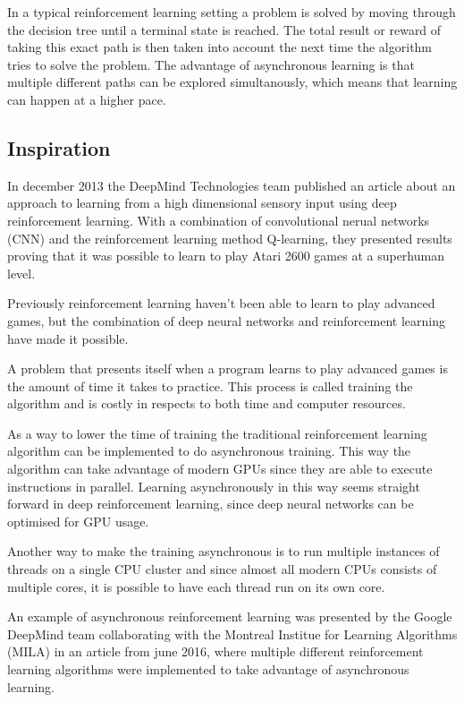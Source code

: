 \documentclass[11pt]{article}
\begin{document}
In a typical reinforcement learning setting a problem is solved
by moving through the decision tree until a terminal state is reached.
The total result or reward of taking this exact path is then
taken into account the next time the algorithm tries to solve the problem.
The advantage of asynchronous learning is that multiple different paths
can be explored simultanously, which means that learning can happen at
a higher pace.

\subsection{Inspiration}

In december 2013 the DeepMind Technologies team published an article
about an approach to learning from a high dimensional sensory input
using deep reinforcement learning\cite{dqn}.
With a combination of convolutional nerual networks (CNN) and
the reinforcement learning method Q-learning\cite{RLbook}, they
presented results proving that it was possible to learn to play Atari
2600 games at a superhuman level.

Previously reinforcement learning haven't been able to learn to play
advanced games, but the combination of deep neural networks and
reinforcement learning have made it possible.

A problem that presents itself when a program learns to play advanced 
games is the amount of time it takes to practice.
This process is called training the algorithm and is costly in respects
to both time and computer resources.

As a way to lower the time of training the traditional reinforcement
learning algorithm can be implemented to do asynchronous training.
This way the algorithm can take advantage of modern GPUs since
they are able to execute instructions in parallel\cite{gpu_stuff}.
Learning asynchronously in this way seems straight forward in deep
reinforcement learning, since deep neural networks can be optimised
for GPU usage.

Another way to make the training asynchronous is to run multiple instances
of threads on a single CPU cluster and since almost all modern CPUs
consists of multiple cores, it is possible to have each thread run on
its own core.

An example of asynchronous reinforcement learning was presented by the
Google DeepMind team collaborating with the Montreal Institue for Learning
Algorithms (MILA) in an article from june 2016, where multiple different
reinforcement learning algorithms were implemented to take advantage of
asynchronous learning\cite{a3c}.
\end{document}
